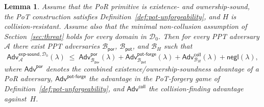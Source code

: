 \documentclass[11pt]{article}
\newtheorem{lemma}{Lemma}
\begin{document}
\begin{lemma}
\label{lem:restricted-exp-reduction}
Assume that the PoR primitive is existence- and ownership-sound, the PoT construction
satisfies Definition~\ref{def:pot-unforgeability}, and $H$ is collision-resistant.
Assume also that the minimal non-collusion assumption of Section~\ref{sec:threat} holds
for every domain in $\mathcal{D}_0$.
Then for every PPT adversary $\mathcal{A}$ there exist PPT adversaries
$\mathcal{B}_{\mathsf{por}}$, $\mathcal{B}_{\mathsf{pot}}$, and $\mathcal{B}_{H}$ such that
\[
  \mathsf{Adv}^{\mathsf{exp\mbox{-}sound},\mathcal{D}_0}_{\mathcal{A}}(\lambda)
  \;\leq\;
  \mathsf{Adv}^{\mathsf{por}}_{\mathcal{B}_{\mathsf{por}}}(\lambda)
  + \mathsf{Adv}^{\mathsf{pot\mbox{-}forge}}_{\mathcal{B}_{\mathsf{pot}}}(\lambda)
  + \mathsf{Adv}^{\mathsf{coll}}_{\mathcal{B}_{H}}(\lambda)
  + \mathsf{negl}(\lambda),
\]
where $\mathsf{Adv}^{\mathsf{por}}$ denotes the combined existence/ownership-soundness
advantage of a PoR adversary, $\mathsf{Adv}^{\mathsf{pot\mbox{-}forge}}$ the advantage in
the PoT-forgery game of Definition~\ref{def:pot-unforgeability}, and
$\mathsf{Adv}^{\mathsf{coll}}$ the collision-finding advantage against~$H$.
\end{lemma}
\end{document}
